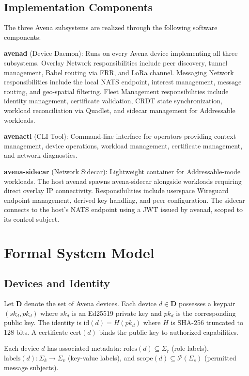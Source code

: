 \documentclass[journal]{IEEEtran}
\begin{document}
\subsection{Implementation Components}

The three Avena subsystems are realized through the following software components:

\textbf{avenad} (Device Daemon): Runs on every Avena device implementing all three subsystems. Overlay Network responsibilities include peer discovery, tunnel management, Babel routing via FRR, and LoRa channel. Messaging Network responsibilities include the local NATS endpoint, interest management, message routing, and geo-spatial filtering. Fleet Management responsibilities include identity management, certificate validation, CRDT state synchronization, workload reconciliation via Quadlet, and sidecar management for Addressable workloads.

\textbf{avenactl} (CLI Tool): Command-line interface for operators providing context management, device operations, workload management, certificate management, and network diagnostics.

\textbf{avena-sidecar} (Network Sidecar): Lightweight container for Addressable-mode workloads. The host avenad spawns avena-sidecar alongside workloads requiring direct overlay IP connectivity. Responsibilities include userspace Wireguard endpoint management, derived key handling, and peer configuration. The sidecar connects to the host's NATS endpoint using a JWT issued by avenad, scoped to its control subject.


\section{Formal System Model}
\label{sec:model}

\subsection{Devices and Identity}

Let $\mathbf{D}$ denote the set of Avena devices. Each device $d \in \mathbf{D}$ possesses a keypair $(sk_d, pk_d)$ where $sk_d$ is an Ed25519 private key and $pk_d$ is the corresponding public key. The identity is $\text{id}(d) = H(pk_d)$ where $H$ is SHA-256 truncated to 128 bits. A certificate $\text{cert}(d)$ binds the public key to authorized capabilities.

Each device $d$ has associated metadata: $\text{roles}(d) \subseteq \Sigma_r$ (role labels), $\text{labels}(d) : \Sigma_k \to \Sigma_v$ (key-value labels), and $\text{scope}(d) \subseteq \mathcal{P}(\Sigma_s)$ (permitted message subjects).
\end{document}
